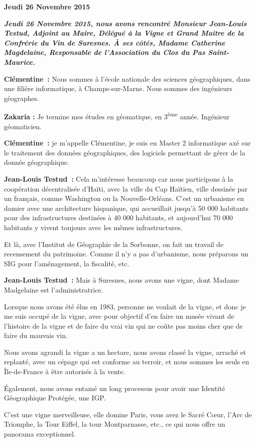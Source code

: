 \documentclass[a4paper, titlepage]{report}
\begin{document}
\textbf{Jeudi 26 Novembre 2015}

\textit{\textbf{Jeudi 26 Novembre 2015, nous avons rencontré Monsieur Jean-Louis Testud,
Adjoint au Maire, Délégué à la Vigne et Grand Maître de la Confrérie du
Vin de Suresnes. À ses côtés, Madame Catherine Magdelaine, Responsable
de l'Association du Clos du Pas Saint-Maurice.}}

\textbf{Clémentine~:} Nous sommes à l'école nationale des sciences
géographiques, dans une filière informatique, à Champs-sur-Marne. Nous
sommes des ingénieurs géographes.

\textbf{Zakaria :} Je termine mes études en géomatique, en
3\textsuperscript{ème} année. Ingénieur géomaticien.

\textbf{Clémentine~:} je m'appelle Clémentine, je suis en Master 2
informatique axé sur le traitement des données géographiques, des
logiciels permettant de gérer de la donnée géographique.

\textbf{Jean-Louis Testud~:} Cela m'intéresse beaucoup car nous
participons à la coopération décentralisée d'Haïti, avec la ville du Cap
Haïtien, ville dessinée par un français, comme Washington ou la
Nouvelle-Orléans. C'est un urbanisme en damier avec une architecture
hispanique, qui accueillait jusqu'à 50 000 habitants pour des
infrastructures destinées à 40 000 habitants, et aujourd'hui 70 000
habitants y vivent toujours avec les mêmes infrastructures.

Et là, avec l'Institut de Géographie de la Sorbonne, on fait un travail de
recensement du patrimoine. Comme il n'y a pas d'urbanisme, nous
préparons un SIG pour l'aménagement, la fiscalité, etc.

\textbf{Jean-Louis Testud~:} Mais à Suresnes, nous avons une vigne, dont
Madame Madgelaine est l'administratrice.

Lorsque nous avons été élus en 1983, personne ne voulait de la vigne, et
donc je me suis occupé de la vigne, avec pour objectif d'en faire un
musée vivant de l'histoire de la vigne et de faire du vrai vin qui ne
coûte pas moins cher que de faire du mauvais vin.

Nous avons agrandi la vigne a un hectare, nous avons classé la vigne,
arraché et replanté, avec un cépage qui est conforme au terroir, et
nous sommes les seuls en Île-de-France à être autorisés à la vente.

Également, nous avons entamé un long processus pour avoir une Identité
Géographique Protégée, une IGP.

C'est une vigne merveilleuse, elle domine Paris, vous avez le Sacré
Cœur, l'Arc de Triomphe, la Tour Eiffel, la tour Montparnasse, etc., ce
qui nous offre un panorama exceptionnel.
\end{document}
